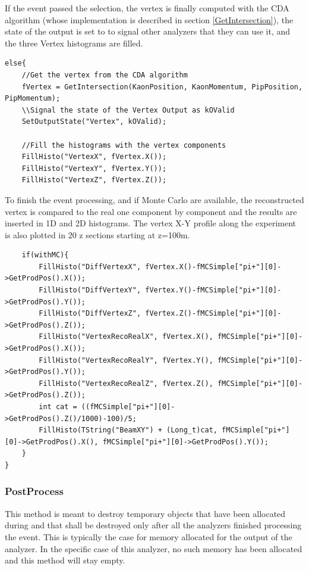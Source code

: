 If the event passed the selection, the vertex is finally computed with the CDA algorithm (whose
implementation is described in section \ref{GetIntersection}), the state of the output is set to
 to signal other analyzers that they can use it, and the three Vertex histograms are
filled.

\begin{lstlisting}
else{
	//Get the vertex from the CDA algorithm
	fVertex = GetIntersection(KaonPosition, KaonMomentum, PipPosition, PipMomentum);
	\\Signal the state of the Vertex Output as kOValid
	SetOutputState("Vertex", kOValid);
	
	//Fill the histograms with the vertex components
	FillHisto("VertexX", fVertex.X());
	FillHisto("VertexY", fVertex.Y());
	FillHisto("VertexZ", fVertex.Z());
\end{lstlisting}

To finish the event processing, and if Monte Carlo are available, the reconstructed vertex is
compared to the real one component by component and the results are inserted in 1D and 2D
histograms. The vertex X-Y profile along the experiment is also plotted in 20 z sections starting
at z=100m.
\begin{lstlisting}
	if(withMC){
		FillHisto("DiffVertexX", fVertex.X()-fMCSimple["pi+"][0]->GetProdPos().X());
		FillHisto("DiffVertexY", fVertex.Y()-fMCSimple["pi+"][0]->GetProdPos().Y());
		FillHisto("DiffVertexZ", fVertex.Z()-fMCSimple["pi+"][0]->GetProdPos().Z());
		FillHisto("VertexRecoRealX", fVertex.X(), fMCSimple["pi+"][0]->GetProdPos().X());
		FillHisto("VertexRecoRealY", fVertex.Y(), fMCSimple["pi+"][0]->GetProdPos().Y());
		FillHisto("VertexRecoRealZ", fVertex.Z(), fMCSimple["pi+"][0]->GetProdPos().Z());
		int cat = ((fMCSimple["pi+"][0]->GetProdPos().Z()/1000)-100)/5;
		FillHisto(TString("BeamXY") + (Long_t)cat, fMCSimple["pi+"][0]->GetProdPos().X(), fMCSimple["pi+"][0]->GetProdPos().Y());
	}
}
\end{lstlisting}

\subsubsection{PostProcess}
This method is meant to destroy temporary objects that have been allocated during 
and that shall be destroyed only after all the analyzers finished processing the event. This is
typically the case for memory allocated for the output of the analyzer. In the specific case of this
analyzer, no such memory has been allocated and this method will stay empty.

